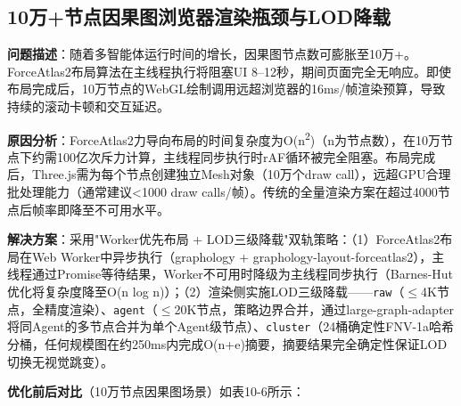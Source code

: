 \documentclass[a4paper]{ctexart}
\makeatletter
\renewcommand{\_}{%
  \ifmmode
    \nfss@text{\textunderscore}%
  \else
    \textunderscore\discretionary{}{}{}%
  \fi}
\makeatother
\begin{document}
\subsection{10万+节点因果图浏览器渲染瓶颈与LOD降载}

\textbf{问题描述}：随着多智能体运行时间的增长，因果图节点数可膨胀至10万+。ForceAtlas2布局算法在主线程执行将阻塞UI 8--12秒，期间页面完全无响应。即使布局完成后，10万节点的WebGL绘制调用远超浏览器的16ms/帧渲染预算，导致持续的滚动卡顿和交互延迟。

\textbf{原因分析}：ForceAtlas2力导向布局的时间复杂度为O(n\textsuperscript{2})（n为节点数），在10万节点下约需100亿次斥力计算，主线程同步执行时rAF循环被完全阻塞。布局完成后，Three.js需为每个节点创建独立Mesh对象（10万个draw call），远超GPU合理批处理能力（通常建议<1000 draw calls/帧）。传统的全量渲染方案在超过4000节点后帧率即降至不可用水平。

\textbf{解决方案}：采用"Worker优先布局 + LOD三级降载"双轨策略：（1）ForceAtlas2布局在Web Worker中异步执行（graphology + graphology-layout-forceatlas2），主线程通过Promise等待结果，Worker不可用时降级为主线程同步执行（Barnes-Hut优化将复杂度降至O(n log n)）；（2）渲染侧实施LOD三级降载——\texttt{raw}（$\leq$4K节点，全精度渲染）、\texttt{agent}（$\leq$20K节点，策略边界合并，通过large-graph-adapter将同Agent的多节点合并为单个Agent级节点）、\texttt{cluster}（24桶确定性FNV-1a哈希分桶，任何规模图在约250ms内完成O(n+e)摘要，摘要结果完全确定性保证LOD切换无视觉跳变）。

\textbf{优化前后对比}（10万节点因果图场景）如表10-6所示：
\end{document}
